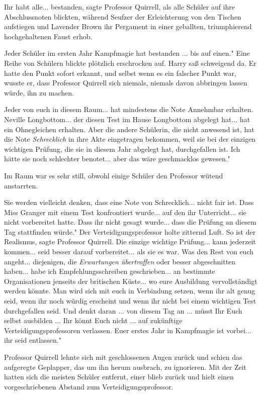 \glqq Ihr habt alle... bestanden\grqq{}, sagte Professor Quirrell, als alle
Schüler auf ihre Abschlussnoten blickten, während Seufzer der Erleichterung von
den Tischen aufstiegen und Lavender Brown ihr Pergament in einer geballten,
triumphierend hochgehaltenen Faust erhob.

\glqq Jeder Schüler im ersten Jahr Kampfmagie hat bestanden ... bis auf einen."
Eine Reihe von Schülern blickte plötzlich erschrocken auf. Harry saß schweigend
da. Er hatte den Punkt sofort erkannt, und selbst wenn es ein falscher Punkt
war, wusste er, dass Professor Quirrell sich niemals, niemals davon abbringen
lassen würde, ihn zu machen.

\glqq Jeder von euch in diesem Raum... hat mindestens die Note Annehmbar
erhalten. Neville Longbottom... der diesen Test im Hause Longbottom abgelegt
hat... hat ein Ohnegleichen erhalten. Aber die andere Schülerin, die nicht
anwesend ist, hat die Note \glqq \emph{Schrecklich}\grqq{} in ihre Akte
eingetragen bekommen, weil sie bei der einzigen wichtigen Prüfung, die sie in
diesem Jahr abgelegt hat, durchgefallen ist. Ich hätte sie noch schlechter
benotet... aber das wäre geschmacklos gewesen."

Im Raum war es sehr still, obwohl einige Schüler den Professor wütend
anstarrten.

\glqq Sie werden vielleicht denken, dass eine Note von Schrecklich... nicht fair
ist. Dass Miss Granger mit einem Test konfrontiert wurde... auf den ihr
Unterricht... sie nicht vorbereitet hatte. Dass ihr nicht gesagt wurde... dass
die Prüfung an diesem Tag stattfinden würde." Der Verteidigungsprofessor holte
zitternd Luft. \glqq So ist der Realismus\grqq{}, sagte Professor Quirrell.
\glqq Die einzige wichtige Prüfung... kann jederzeit kommen... seid besser
darauf vorbereitet... als sie es war. Was den Rest von euch angeht...
diejenigen, die \emph{Erwartungen übertroffen} oder besser abgeschnitten
haben... habe ich Empfehlungsschreiben geschrieben... an bestimmte
Organisationen jenseits der britischen Küste... wo eure Ausbildung
vervollständigt werden könnte. Man wird sich mit euch in Verbindung setzen, wenn
ihr alt genug seid, wenn ihr noch würdig erscheint und wenn ihr nicht bei einem
wichtigen Test durchgefallen seid. Und denkt daran ... von diesem Tag an ...
müsst Ihr Euch selbst ausbilden ... Ihr könnt Euch nicht ... auf zukünftige
Verteidigungsprofessoren verlassen. Euer erstes Jahr in Kampfmagie ist vorbei...
ihr seid entlassen."

Professor Quirrell lehnte sich mit geschlossenen Augen zurück und schien das
aufgeregte Geplapper, das um ihn herum ausbrach, zu ignorieren. Mit der Zeit
hatten sich die meisten Schüler entfernt, einer blieb zurück und hielt einen
vorgeschriebenen Abstand zum Verteidigungsprofessor.

